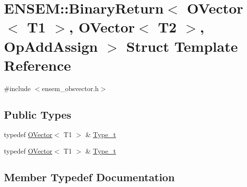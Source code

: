 \hypertarget{structENSEM_1_1BinaryReturn_3_01OVector_3_01T1_01_4_00_01OVector_3_01T2_01_4_00_01OpAddAssign_01_4}{}\section{E\+N\+S\+EM\+:\+:Binary\+Return$<$ O\+Vector$<$ T1 $>$, O\+Vector$<$ T2 $>$, Op\+Add\+Assign $>$ Struct Template Reference}
\label{structENSEM_1_1BinaryReturn_3_01OVector_3_01T1_01_4_00_01OVector_3_01T2_01_4_00_01OpAddAssign_01_4}


{\ttfamily \#include $<$ensem\+\_\+obsvector.\+h$>$}

\subsection*{Public Types}
\begin{DoxyCompactItemize}
\item 
typedef \mbox{\hyperlink{classENSEM_1_1OVector}{O\+Vector}}$<$ T1 $>$ \& \mbox{\hyperlink{structENSEM_1_1BinaryReturn_3_01OVector_3_01T1_01_4_00_01OVector_3_01T2_01_4_00_01OpAddAssign_01_4_a6a0e2c2cf466c9c8da44fef6943d3385}{Type\+\_\+t}}
\item 
typedef \mbox{\hyperlink{classENSEM_1_1OVector}{O\+Vector}}$<$ T1 $>$ \& \mbox{\hyperlink{structENSEM_1_1BinaryReturn_3_01OVector_3_01T1_01_4_00_01OVector_3_01T2_01_4_00_01OpAddAssign_01_4_a6a0e2c2cf466c9c8da44fef6943d3385}{Type\+\_\+t}}
\end{DoxyCompactItemize}


\subsection{Member Typedef Documentation}
\mbox{\label{structENSEM_1_1BinaryReturn_3_01OVector_3_01T1_01_4_00_01OVector_3_01T2_01_4_00_01OpAddAssign_01_4_a6a0e2c2cf466c9c8da44fef6943d3385}} 
